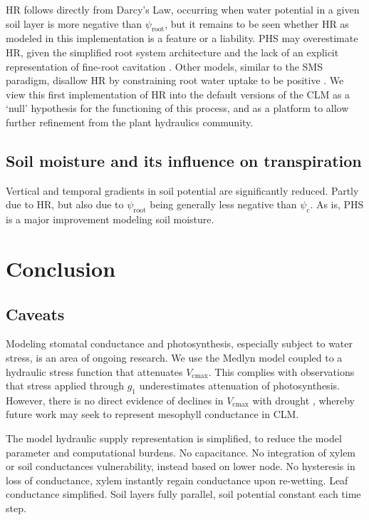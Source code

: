 \documentclass[draft,linenumbers]{agujournal}
\begin{document}
    HR follows directly from Darcy's Law, occurring when water potential in a given soil layer is more negative than $\psi_{\text{root}}$,
    but it remains to be seen whether HR as modeled in this implementation is a feature or a liability.
    PHS may overestimate HR, given the simplified root system architecture \citep{bouda2017} 
    and the lack of an explicit representation of fine-root cavitation \citep{kotowska2015}.
    Other models, similar to the SMS paradigm, disallow HR by constraining root water uptake to be positive \citep{xu2016}.
    We view this first implementation of HR into the default versions of the CLM as a `null' hypothesis for the functioning of this process, and as a platform to allow further refinement from the plant hydraulics community. 

\subsection{Soil moisture and its influence on transpiration}

Vertical and temporal gradients in soil potential are significantly reduced.
Partly due to HR, but also due to $\psi_{\text{root}}$ being generally less negative than $\psi_c$.
As is, PHS is a major improvement modeling soil moisture.
 

\section{Conclusion}

\subsection{Caveats}

    Modeling stomatal conductance and photosynthesis, especially subject to water stress, is an area of ongoing research. We use the Medlyn model coupled to a hydraulic stress function that attenuates $V_{\text{cmax}}$. This complies with observations \citep{lin2018,zhou2013} that stress applied through $g_1$ underestimates attenuation of photosynthesis. However, there is no direct evidence of declines in $V_{\text{cmax}}$ with drought \citep{flexas2006}, whereby future work may seek to represent mesophyll conductance in CLM.
    
    The model hydraulic supply representation is simplified, to reduce the model parameter and computational burdens.
    No capacitance.
    No integration of xylem or soil conductances vulnerability, instead based on lower node.
    No hysteresis in loss of conductance, xylem instantly regain conductance upon re-wetting.
    Leaf conductance simplified.
    Soil layers fully parallel, soil potential constant each time step.
    
\end{document}
